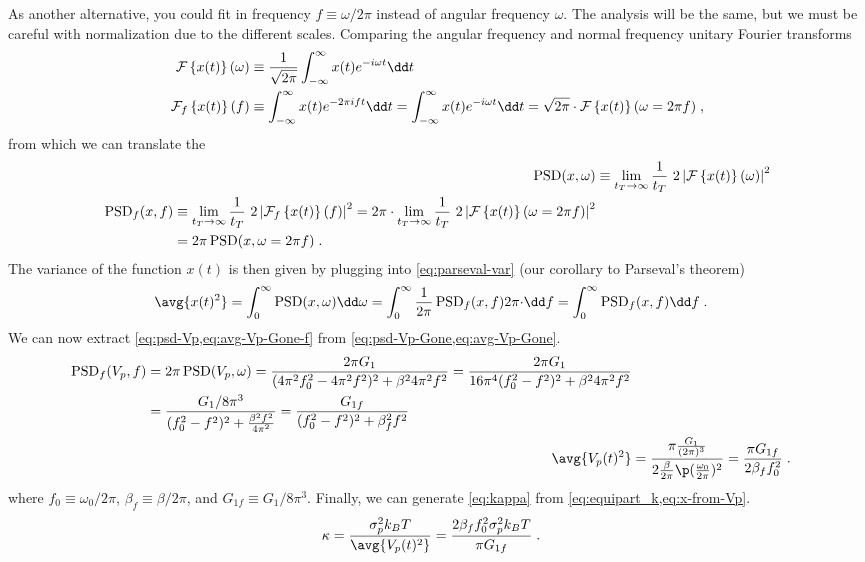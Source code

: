 As another alternative, you could fit in frequency
$f\equiv\omega/2\pi$ instead of angular frequency $\omega$.  The
analysis will be the same, but we must be careful with normalization
due to the different scales.  Comparing the angular frequency and
normal frequency unitary Fourier transforms
\begin{align}
  \Four{x(t)}(\omega)
    &\equiv \frac{1}{\sqrt{2\pi}} \iInfInf{t}{x(t) e^{-i \omega t}} \\
  \Fourf{x(t)}(f) &\equiv \iInfInf{t}{x(t) e^{-2\pi i f t}}
     = \iInfInf{t}{x(t) e^{-i \omega t}}
     = \sqrt{2\pi}\cdot\Four{x(t)}(\omega=2\pi f) \;,
\end{align}
from which we can translate the \PSD
\begin{align}
  \operatorname{PSD}(x, \omega) &\equiv \lim_{{t_T}\rightarrow \infty} \frac{1}{t_T}\  2 \left|{ {\mathcal F}\left\{ {x(t)} \right\}(\omega) }\right|^2 \\
  \begin{split}
  \operatorname{PSD}_f(x, f) &\equiv \lim_{{t_T}\rightarrow \infty} \frac{1}{t_T}\  2 \left|{ {\mathcal F}_f\left\{ {x(t)} \right\}(f) }\right|^2
    = 2\pi \cdot \lim_{{t_T}\rightarrow \infty} \frac{1}{t_T}\  2 \left|{ {\mathcal F}\left\{ {x(t)} \right\}(\omega=2\pi f) }\right|^2 \\
    &= 2\pi \operatorname{PSD}(x, \omega=2\pi f) \;.
  \end{split}
\end{align}
%
%
The variance of the function $x(t)$ is then given by plugging into
\cref{eq:parseval-var} (our corollary to Parseval's theorem)
\begin{align}
  \avg{x(t)^2} &= \iOInf{\omega}{\PSD(x,\omega)}
     = \iOInf{f}{\frac{1}{2\pi}\PSD_f(x,f)2\pi\cdot}
     = \iOInf{f}{\PSD_f(x,f)} \;.
\end{align}
We can now extract \cref{eq:psd-Vp,eq:avg-Vp-Gone-f} from
\cref{eq:psd-Vp-Gone,eq:avg-Vp-Gone}.
\begin{align}
  \begin{split}
  \PSD_f(V_p, f) &= 2\pi\PSD(V_p, \omega)
     = \frac{2\pi G_1}{(4\pi^2f_0^2-4\pi^2f^2)^2 + \beta^2 4\pi^2f^2}
     = \frac{2\pi G_1}{16\pi^4(f_0^2-f^2)^2 + \beta^2 4\pi^2f^2} \\
     &= \frac{G_1/8\pi^3}{(f_0^2-f^2)^2 + \frac{\beta^2 f^2}{4\pi^2}}
     = \frac{G_{1f}}{(f_0^2-f^2)^2 + \beta_f^2 f^2}
  \end{split} \\
  \avg{V_p(t)^2}
    &= \frac{\pi \frac{G_1}{(2\pi)^3}}
      {2 \frac{\beta}{2\pi} \p({\frac{\omega_0}{2\pi}})^2}
    = \frac{\pi G_{1f}}{2 \beta_f f_0^2} \;.
\end{align}
where $f_0\equiv\omega_0/2\pi$, $\beta_f\equiv\beta/2\pi$, and
$G_{1f}\equiv G_1/8\pi^3$.  Finally, we can generate
\cref{eq:kappa} from \cref{eq:equipart_k,eq:x-from-Vp}.
\begin{align}
  \kappa &= \frac{\sigma_p^2 k_BT}{\avg{V_p(t)^2}}
    = \frac{2 \beta_f f_0^2 \sigma_p^2 k_BT}{\pi G_{1f}} \;.
\end{align}


